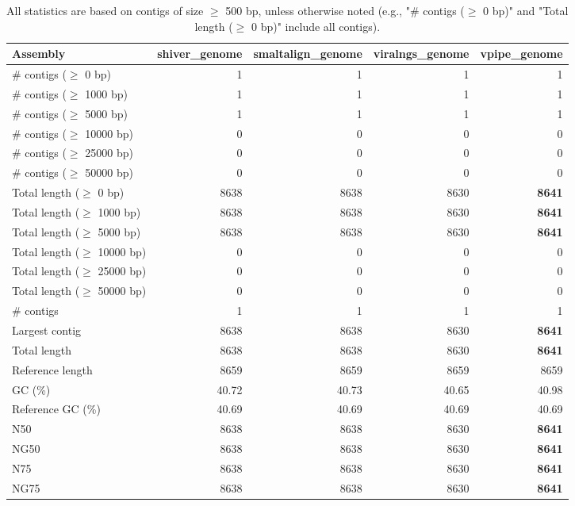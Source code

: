 \documentclass[12pt,a4paper]{article}
\begin{document}
\begin{table}[ht]
\begin{center}
\caption{All statistics are based on contigs of size $\geq$ 500 bp, unless otherwise noted (e.g., "\# contigs ($\geq$ 0 bp)" and "Total length ($\geq$ 0 bp)" include all contigs).}
\begin{tabular}{|l*{4}{|r}|}
\hline
Assembly & shiver\_genome & smaltalign\_genome & viralngs\_genome & vpipe\_genome \\ \hline
\# contigs ($\geq$ 0 bp) & 1 & 1 & 1 & 1 \\ \hline
\# contigs ($\geq$ 1000 bp) & 1 & 1 & 1 & 1 \\ \hline
\# contigs ($\geq$ 5000 bp) & 1 & 1 & 1 & 1 \\ \hline
\# contigs ($\geq$ 10000 bp) & 0 & 0 & 0 & 0 \\ \hline
\# contigs ($\geq$ 25000 bp) & 0 & 0 & 0 & 0 \\ \hline
\# contigs ($\geq$ 50000 bp) & 0 & 0 & 0 & 0 \\ \hline
Total length ($\geq$ 0 bp) & 8638 & 8638 & 8630 & {\bf 8641} \\ \hline
Total length ($\geq$ 1000 bp) & 8638 & 8638 & 8630 & {\bf 8641} \\ \hline
Total length ($\geq$ 5000 bp) & 8638 & 8638 & 8630 & {\bf 8641} \\ \hline
Total length ($\geq$ 10000 bp) & 0 & 0 & 0 & 0 \\ \hline
Total length ($\geq$ 25000 bp) & 0 & 0 & 0 & 0 \\ \hline
Total length ($\geq$ 50000 bp) & 0 & 0 & 0 & 0 \\ \hline
\# contigs & 1 & 1 & 1 & 1 \\ \hline
Largest contig & 8638 & 8638 & 8630 & {\bf 8641} \\ \hline
Total length & 8638 & 8638 & 8630 & {\bf 8641} \\ \hline
Reference length & 8659 & 8659 & 8659 & 8659 \\ \hline
GC (\%) & 40.72 & 40.73 & 40.65 & 40.98 \\ \hline
Reference GC (\%) & 40.69 & 40.69 & 40.69 & 40.69 \\ \hline
N50 & 8638 & 8638 & 8630 & {\bf 8641} \\ \hline
NG50 & 8638 & 8638 & 8630 & {\bf 8641} \\ \hline
N75 & 8638 & 8638 & 8630 & {\bf 8641} \\ \hline
NG75 & 8638 & 8638 & 8630 & {\bf 8641} \\ \hline

\end{tabular}
\end{center}
\end{table}
\end{document}
